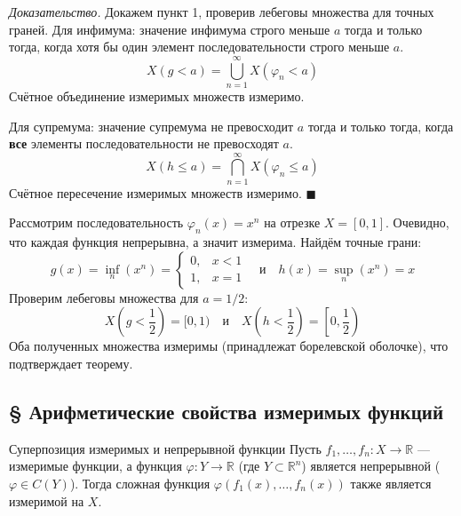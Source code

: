 \documentclass[12pt,a4paper]{article}
\newenvironment{Proof}[1][Доказательство]{\vspace{0.5em}\noindent\textit{#1.}\hspace{0.5em}\ignorespaces}{\hfill$\blacksquare$\vspace{1em}}
\begin{document}
\begin{Proof}
Докажем пункт 1, проверив лебеговы множества для точных граней.
Для инфимума: значение инфимума строго меньше $a$ тогда и только тогда, когда хотя бы один элемент последовательности строго меньше $a$. 
$$ X(g < a) = \bigcup\limits_{n=1}^{\infty} X(\varphi_n < a) $$
Счётное объединение измеримых множеств измеримо.

Для супремума: значение супремума не превосходит $a$ тогда и только тогда, когда \textbf{все} элементы последовательности не превосходят $a$.
$$ X(h \le a) = \bigcap\limits_{n=1}^{\infty} X(\varphi_n \le a) $$
Счётное пересечение измеримых множеств измеримо.
\end{Proof}

\begin{Example}
Рассмотрим последовательность $\varphi_n(x) = x^n$ на отрезке $X = [0, 1]$. Очевидно, что каждая функция непрерывна, а значит измерима.
Найдём точные грани:
$$ g(x) = \inf\limits_n (x^n) = \begin{cases} 0, & x < 1 \\ 1, & x = 1 \end{cases} \quad \text{и} \quad h(x) = \sup\limits_n (x^n) = x $$
Проверим лебеговы множества для $a = 1/2$:
$$ X\left(g < \frac{1}{2}\right) = [0, 1) \quad \text{и} \quad X\left(h < \frac{1}{2}\right) = \left[0, \frac{1}{2}\right) $$
Оба полученных множества измеримы (принадлежат борелевской оболочке), что подтверждает теорему.
\end{Example}

\subsection{§ Арифметические свойства измеримых функций}

\begin{Theorem}{Суперпозиция измеримых и непрерывной функции}{}
Пусть $f_1, \dots, f_n : X \to \mathbb{R}$ — измеримые функции, а функция $\varphi : Y \to \mathbb{R}$ (где $Y \subset \mathbb{R}^n$) является непрерывной ($\varphi \in C(Y)$). 
Тогда сложная функция $\varphi(f_1(x), \dots, f_n(x))$ также является измеримой на $X$.
\end{Theorem}
\end{document}
